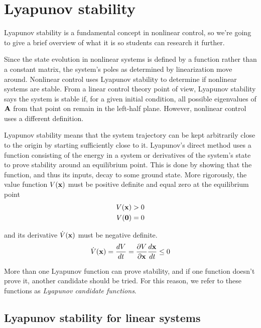 \section{Lyapunov stability}

Lyapunov stability is a fundamental concept in nonlinear control, so we're going
to give a brief overview of what it is so students can research it further.

Since the \gls{state} evolution in nonlinear \glspl{system} is defined by a
function rather than a constant matrix, the \gls{system}'s poles as determined
by \gls{linearization} move around. Nonlinear control uses Lyapunov stability to
determine if nonlinear \glspl{system} are stable. From a linear control theory
point of view, Lyapunov stability says the \gls{system} is stable if, for a
given initial condition, all possible eigenvalues of $\mathbf{A}$ from that point
on remain in the left-half plane. However, nonlinear control uses a different
definition.

Lyapunov stability means that the \gls{system} trajectory can be kept
arbitrarily close to the origin by starting sufficiently close to it. Lyapunov's
direct method uses a function consisting of the energy in a \gls{system} or
derivatives of the \gls{system}'s \gls{state} to prove stability around an
equilibrium point. This is done by showing that the function, and thus its
inputs, decay to some ground state. More rigorously, the value function
$V(\mathbf{x})$ must be positive definite and equal zero at the equilibrium point
\begin{align*}
  V(\mathbf{x}) > 0 \\
  V(\mathbf{0}) = 0
\end{align*}

and its derivative $\dot{V}(\mathbf{x})$ must be negative definite.
\begin{equation*}
  \dot{V}(\mathbf{x}) = \frac{dV}{dt} =
    \frac{\partial V}{\partial \mathbf{x}} \frac{d\mathbf{x}}{dt} \leq 0
\end{equation*}

More than one Lyapunov function can prove stability, and if one function doesn't
prove it, another candidate should be tried. For this reason, we refer to these
functions as \textit{Lyapunov candidate functions}.

\subsection{Lyapunov stability for linear systems}

